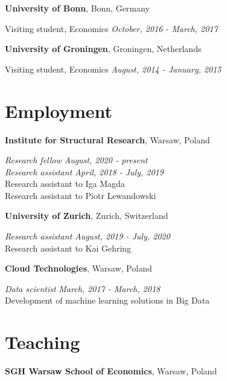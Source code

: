 \documentclass[margin,line]{res}
\newenvironment{list1}{
  \begin{list}{\ding{113}}{%
      \setlength{\itemsep}{0in}
      \setlength{\parsep}{0in} \setlength{\parskip}{0in}
      \setlength{\topsep}{0in} \setlength{\partopsep}{0in} 
      \setlength{\leftmargin}{0.17in}}}{\end{list}}
\begin{document}
\begin{resume}
{\bf University of Bonn}, Bonn, Germany\\
\vspace*{-.1in}
\begin{list1}
\item[] Visiting student, Economics \hfill \textit{October, 2016 - March, 2017}
\end{list1}

{\bf University of Groningen}, Groningen, Netherlands\\
\vspace*{-.1in}
\begin{list1}
\item[] Visiting student, Economics \hfill \textit{August, 2014 - January, 2015}
\end{list1}

\section{\sc Employment}
{\bf Institute for Structural Research}, Warsaw, Poland

\vspace{-.3cm}
{\em Research fellow} \hfill \textit{August, 2020 - present}\\
{\em Research assistant} \hfill \textit{April, 2018 - July, 2019}\\
Research assistant to Iga Magda\\ 
Research assistant to Piotr Lewandowski 
\vspace*{.05in} 

{\bf University of Zurich}, Zurich, Switzerland

\vspace{-.3cm}
{\em Research assistant} \hfill \textit{August, 2019 - July, 2020}\\
Research assistant to Kai Gehring
\vspace*{.05in}  

{\bf Cloud Technologies}, Warsaw, Poland

\vspace{-.3cm}
{\em Data scientist} \hfill \textit{March, 2017 - March, 2018}\\
Development of machine learning solutions in Big Data
\vspace*{.05in}  

\section{\sc Teaching}
{\bf SGH Warsaw School of Economics}, Warsaw, Poland


\end{resume}
\end{document}
